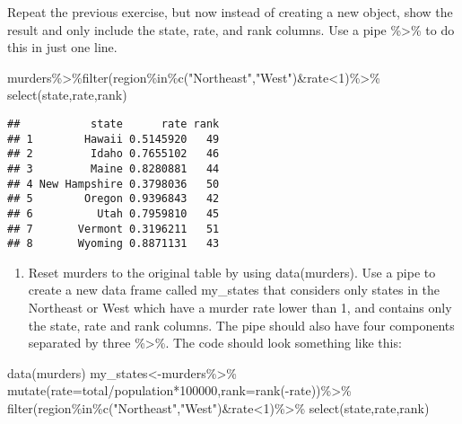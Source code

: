 \documentclass[
]{article}
\newenvironment{Shaded}{\begin{snugshade}}{\end{snugshade}}
\newcommand{\AttributeTok}[1]{\textcolor[rgb]{0.77,0.63,0.00}{#1}}
\newcommand{\DecValTok}[1]{\textcolor[rgb]{0.00,0.00,0.81}{#1}}
\newcommand{\FunctionTok}[1]{\textcolor[rgb]{0.00,0.00,0.00}{#1}}
\newcommand{\NormalTok}[1]{#1}
\newcommand{\OtherTok}[1]{\textcolor[rgb]{0.56,0.35,0.01}{#1}}
\newcommand{\SpecialCharTok}[1]{\textcolor[rgb]{0.00,0.00,0.00}{#1}}
\newcommand{\StringTok}[1]{\textcolor[rgb]{0.31,0.60,0.02}{#1}}
\providecommand{\tightlist}{%
  \setlength{\itemsep}{0pt}\setlength{\parskip}{0pt}}
\begin{document}
Repeat the previous exercise, but now instead of creating a new object,
show the result and only include the state, rate, and rank columns. Use
a pipe \%\textgreater\% to do this in just one line.

\begin{Shaded}
\begin{Highlighting}[]
\NormalTok{murders}\SpecialCharTok{\%\textgreater{}\%}\FunctionTok{filter}\NormalTok{(region}\SpecialCharTok{\%in\%}\FunctionTok{c}\NormalTok{(}\StringTok{"Northeast"}\NormalTok{,}\StringTok{"West"}\NormalTok{)}\SpecialCharTok{\&}\NormalTok{rate}\SpecialCharTok{\textless{}}\DecValTok{1}\NormalTok{)}\SpecialCharTok{\%\textgreater{}\%}
  \FunctionTok{select}\NormalTok{(state,rate,rank)}
\end{Highlighting}
\end{Shaded}

\begin{verbatim}
##           state      rate rank
## 1        Hawaii 0.5145920   49
## 2         Idaho 0.7655102   46
## 3         Maine 0.8280881   44
## 4 New Hampshire 0.3798036   50
## 5        Oregon 0.9396843   42
## 6          Utah 0.7959810   45
## 7       Vermont 0.3196211   51
## 8       Wyoming 0.8871131   43
\end{verbatim}

\begin{enumerate}
\def\labelenumi{\arabic{enumi}.}
\setcounter{enumi}{1}
\tightlist
\item
  Reset murders to the original table by using data(murders). Use a pipe
  to create a new data frame called my\_states that considers only
  states in the Northeast or West which have a murder rate lower than 1,
  and contains only the state, rate and rank columns. The pipe should
  also have four components separated by three \%\textgreater\%. The
  code should look something like this:
\end{enumerate}

\begin{Shaded}
\begin{Highlighting}[]
\FunctionTok{data}\NormalTok{(murders)}
\NormalTok{my\_states}\OtherTok{\textless{}{-}}\NormalTok{murders}\SpecialCharTok{\%\textgreater{}\%}
  \FunctionTok{mutate}\NormalTok{(}\AttributeTok{rate=}\NormalTok{total}\SpecialCharTok{/}\NormalTok{population}\SpecialCharTok{*}\DecValTok{100000}\NormalTok{,}\AttributeTok{rank=}\FunctionTok{rank}\NormalTok{(}\SpecialCharTok{{-}}\NormalTok{rate))}\SpecialCharTok{\%\textgreater{}\%}
  \FunctionTok{filter}\NormalTok{(region}\SpecialCharTok{\%in\%}\FunctionTok{c}\NormalTok{(}\StringTok{"Northeast"}\NormalTok{,}\StringTok{"West"}\NormalTok{)}\SpecialCharTok{\&}\NormalTok{rate}\SpecialCharTok{\textless{}}\DecValTok{1}\NormalTok{)}\SpecialCharTok{\%\textgreater{}\%}
  \FunctionTok{select}\NormalTok{(state,rate,rank)}
\end{Highlighting}
\end{Shaded}
\end{document}
